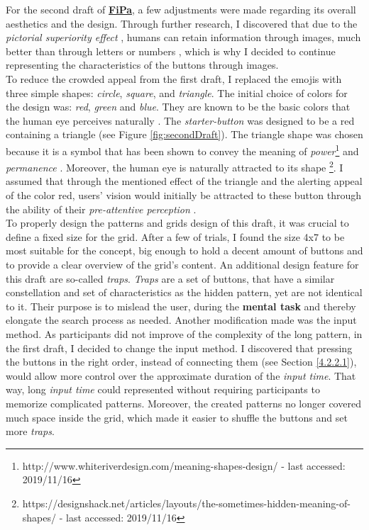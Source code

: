 For the second draft of \underline{\textbf{FiPa}}, a few adjustments were made  regarding its overall aesthetics and the design. Through further research, I discovered that due to the \textit{pictorial superiority effect} \cite{pictorial}, humans can retain information through images, much better than through letters or numbers \cite{pictorial, 2014}, which is why I decided to continue representing the characteristics of the buttons through images.\\
To reduce the crowded appeal from the first draft, I replaced the emojis with three simple shapes: \textit{circle}, \textit{square}, and \textit{triangle}. The initial choice of colors for the design was: \textit{red}, \textit{green} and \textit{blue}. They are known to be the basic colors that the human eye perceives naturally \cite{Butz2014}. The \textit{starter-button} was designed to be a red containing a triangle (see Figure \ref{fig:secondDraft}). The triangle shape was chosen because it is a symbol that has been shown to convey the meaning of \textit{power}\footnote{http://www.whiteriverdesign.com/meaning-shapes-design/ - last accessed: 2019/11/16} and \textit{permanence} \cite{Frutiger1998}.  Moreover, the human eye is naturally attracted to its shape \footnote{https://designshack.net/articles/layouts/the-sometimes-hidden-meaning-of-shapes/ - last accessed: 2019/11/16}. I assumed that through the mentioned effect of the triangle and the alerting appeal of the color red, users' vision would initially be attracted to these button through the ability of their \textit{pre-attentive perception} \cite{Butz2014}. \\

To properly design the patterns and grids design of this draft, it was crucial to define a fixed size for the grid. After a few of trials, I found the size 4x7 to be most suitable for the concept, big enough to hold a decent amount of buttons and to provide a clear overview of the grid's content. An additional design feature for this draft are so-called \textit{traps}. \textit{Traps} are a set of buttons, that have a similar constellation and set of characteristics as the hidden pattern, yet are not identical to it. Their purpose is to mislead the user, during the \textbf{mental task} and thereby elongate the search process as needed. Another modification made was the input method. As participants did not improve of the complexity of the long pattern, in the first draft, I decided to change the input method. I discovered that pressing the buttons in the right order, instead of connecting them (see Section \ref{4.2.2.1}), would allow more control over the approximate duration of the \textit{input time}. That way, long \textit{input time} could represented without requiring participants to memorize complicated patterns. Moreover, the created patterns no longer covered much space inside the grid, which made it easier to shuffle the buttons and set more \textit{traps}. 

